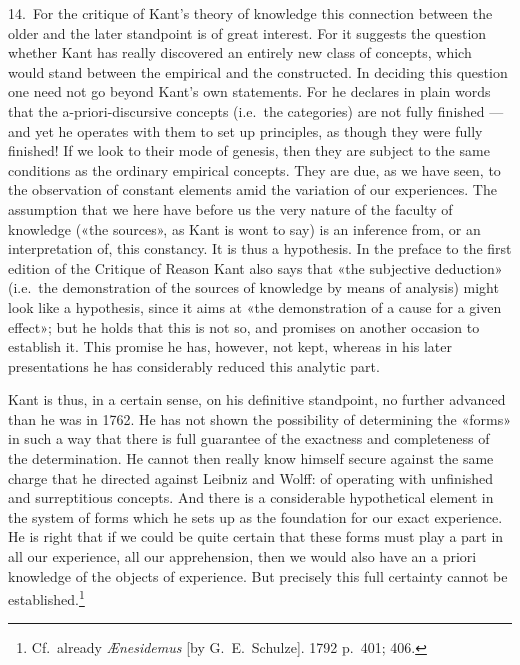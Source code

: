 \documentclass[12pt,a4paper]{article}
\newcommand{\opage}[1]{\marginnote{\footnotesize\textit{[#1]}}}
\begin{document}
14.\ For the critique of Kant's theory of knowledge this connection between
the older and the later standpoint is of great interest. For it suggests
the question whether Kant has really discovered an entirely new class of
concepts, which would stand between the empirical and the constructed. In
deciding this question one need not go beyond Kant's own statements. For he
declares in plain words that the a-priori-discursive concepts (i.e.\ the
categories) are not fully finished --- and yet he operates with them to set
up principles, as though they were fully finished! If we look to their mode
of genesis, then they are subject to the same conditions as the ordinary
empirical concepts. They are due, as we have seen, to the observation of
constant elements amid the variation of our experiences. The assumption
that we here have before us the very nature of the faculty of knowledge
(«the sources», as Kant is wont to say) is an inference from, or an
interpretation of, this constancy. It is thus a hypothesis. In the preface
to the first edition of the Critique of Reason Kant also says that «the
subjective deduction» (i.e.\ the demonstration of the sources of knowledge
by means of analysis) might look like a hypothesis, since it aims at «the
demonstration of a cause for a given effect»; but he holds that this is not
so, and promises on another occasion to establish it. This promise he has,
however, not kept, whereas in his later presentations he has considerably
reduced this analytic part.

Kant is thus, in a certain sense, on his definitive standpoint, no further
advanced than \opage{30}he was in 1762. He has not shown the possibility of
determining the «forms» in such a way that there is full guarantee of the
exactness and completeness of the determination. He cannot then really know
himself secure against the same charge that he directed against Leibniz and
Wolff: of operating with unfinished and surreptitious concepts. And there
is a considerable hypothetical element in the system of forms which he sets
up as the foundation for our exact experience. He is right that if we could
be quite certain that these forms must play a part in all our experience,
all our apprehension, then we would also have an a priori knowledge of the
objects of experience. But precisely this full certainty cannot be
established.\footnote{Cf.\ already
\textit{Ænesidemus} [by G.\ E.\ Schulze]. 1792 p.\ 401; 406.}
\end{document}
